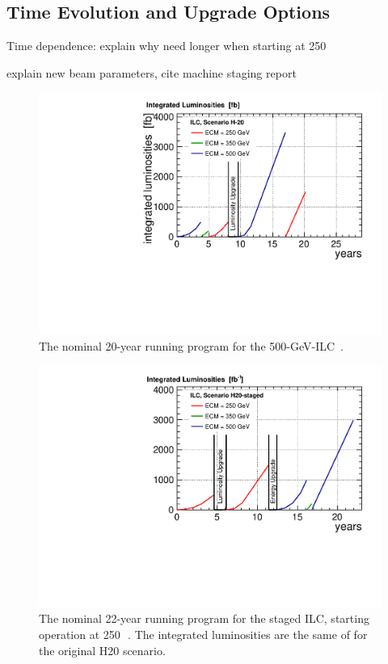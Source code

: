 \subsection{Time Evolution and Upgrade Options}
{\color{red} Time dependence: explain why need longer when starting at 250\,\GeV}

{\color{red} explain new beam parameters, cite machine staging report}


\begin{figure}
\begin{center}
\includegraphics[width=0.75\hsize]{chapters/figures/lumi_H-20.pdf}
\end{center}
\caption{The nominal 20-year running program for the 500-GeV-ILC~\cite{Barklow:2015tja}.}
\label{fig:H20}
\end{figure}

\begin{figure}
\begin{center}
\includegraphics[width=0.75\hsize]{chapters/figures/lumi_H20-staged}
\end{center}
\caption{The nominal 22-year running program for the staged ILC, starting operation at 250\,\GeV ~\cite{Fujii:2017vwa}. The integrated luminosities are the same of for the original H20 scenario.}
\label{fig:H20staged}
\end{figure}


